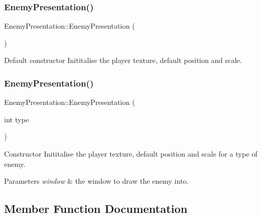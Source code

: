 \subsubsection{\texorpdfstring{Enemy\+Presentation()}{EnemyPresentation()}\hspace{0.1cm}{\footnotesize\ttfamily [1/2]}}
{\footnotesize\ttfamily Enemy\+Presentation\+::\+Enemy\+Presentation (\begin{DoxyParamCaption}{ }\end{DoxyParamCaption})}



Default constructor Inititalise the player texture, default position and scale. 

\mbox{\label{class_enemy_presentation_a78e7f250c31e2e6d6327ead1ef12f4c8}} 
\subsubsection{\texorpdfstring{Enemy\+Presentation()}{EnemyPresentation()}\hspace{0.1cm}{\footnotesize\ttfamily [2/2]}}
{\footnotesize\ttfamily Enemy\+Presentation\+::\+Enemy\+Presentation (\begin{DoxyParamCaption}\item[{int}]{type }\end{DoxyParamCaption})}



Constructor Inititalise the player texture, default position and scale for a type of enemy. 


\begin{DoxyParams}{Parameters}
{\em window} & the window to draw the enemy into. \\
\hline
\end{DoxyParams}


\subsection{Member Function Documentation}
\mbox{\label{class_enemy_presentation_abad20ddfb250e1c31a4d4581fa7d2571}} 
